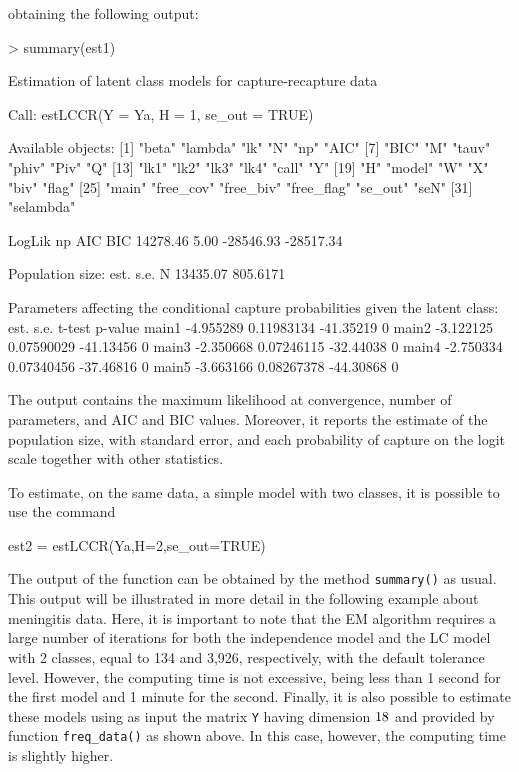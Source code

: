\noindent obtaining the following output:
\begin{example*}
> summary(est1)

Estimation of latent class models for capture-recapture data

Call:
estLCCR(Y = Ya, H = 1, se_out = TRUE)

Available objects:
 [1] "beta"      "lambda"    "lk"        "N"         "np"        "AIC"
 [7] "BIC"       "M"         "tauv"      "phiv"      "Piv"       "Q"
[13] "lk1"       "lk2"       "lk3"       "lk4"       "call"      "Y"
[19] "H"         "model"     "W"         "X"         "biv"       "flag"
[25] "main"      "free_cov"  "free_biv"  "free_flag" "se_out"    "seN"
[31] "selambda"

   LogLik        np       AIC       BIC
 14278.46      5.00 -28546.93 -28517.34

Population size:
      est.     s.e.
N 13435.07 805.6171

Parameters affecting the conditional capture probabilities given the latent class:
           est.       s.e.    t-test p-value
main1 -4.955289 0.11983134 -41.35219       0
main2 -3.122125 0.07590029 -41.13456       0
main3 -2.350668 0.07246115 -32.44038       0
main4 -2.750334 0.07340456 -37.46816       0
main5 -3.663166 0.08267378 -44.30868       0
\end{example*}

\noindent The output contains the maximum likelihood at convergence, number of parameters, and AIC and BIC values.
Moreover, it reports the estimate of the population size, with standard error, and each probability of capture on the logit scale together with other statistics.

To estimate, on the same data, a simple model with two classes, it is possible to use the command
\begin{example*}
est2 = estLCCR(Ya,H=2,se_out=TRUE)
\end{example*}

\noindent The output of the function can be obtained by the method {\tt summary()} as usual.
This output will be illustrated in more detail in the following example about meningitis data.
Here, it is important to note that the EM algorithm requires a large number of iterations for both the independence model and the LC model with 2 classes, equal to 134 and 3,926, respectively, with the default tolerance level.
However, the computing time is not excessive, being less than 1 second for the first model and 1 minute for the second.
Finally, it is also possible to estimate these models using as input the matrix {\tt Y} having dimension $18\time 32$ and provided by function {\tt freq\_data()} as shown above.
In this case, however, the computing time is slightly higher.
%
